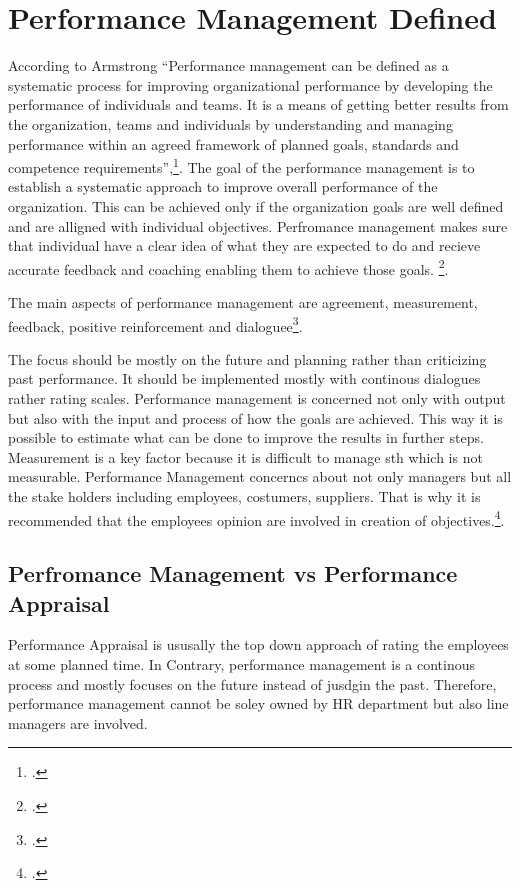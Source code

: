 \newpage
\section{Performance Management Defined} \label{definition}
According to Armstrong \enquote{Performance management can be defined as a systematic process for
improving organizational performance by developing the performance of
individuals and teams. It is a means of getting better results from the
organization, teams and individuals by understanding and managing
performance within an agreed framework of planned goals, standards
and competence requirements},\footcite[See.][S. 1]{Armstrong2006}. The goal of the performance management is to establish a systematic approach to improve overall performance of the organization. This can be achieved only if the organization goals are well defined and are alligned with individual objectives. Perfromance management makes sure that individual have a clear idea  of what they are expected to do and recieve accurate feedback and coaching enabling them to achieve those goals. \footcite[See.][]{Armstrong2006}.

The main aspects of performance management are agreement, measurement, feedback, positive reinforcement
and dialoguee\footcite[See.][]{Armstrong2006}.

The focus should be mostly on the future and planning rather than criticizing past performance. It should be implemented mostly with continous dialogues rather rating scales. Performance management is concerned not only with output but also with the input and process of how the goals are achieved. This way it is possible to estimate what can be done to improve the results in further steps. Measurement is a key factor because it is difficult to manage sth which is not measurable. Performance Management concerncs about not only managers but all the stake holders including employees, costumers, suppliers. That is why it is recommended that the employees opinion are involved in creation of objectives.\footcite[See.][]{Armstrong2006}. 	 	


\subsection{Perfromance Management vs Performance Appraisal}

Performance Appraisal is ususally the top down approach of rating the employees at some planned time. In Contrary, performance management is a continous process and mostly focuses on the future instead of jusdgin the past. Therefore, performance management cannot be soley owned by HR department but also line managers are involved.
